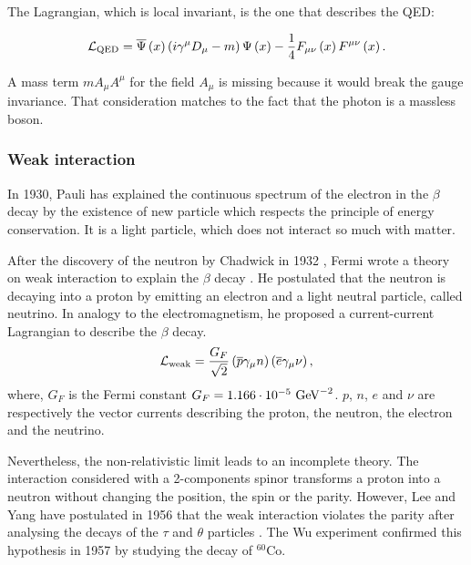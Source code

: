       The Lagrangian, which is local invariant, is the one that describes the \gls{QED}:

      \begin{equation}
          \mathcal{L}_{\rm{QED}} =  \overline{\Psi}\left(x\right)\left( i \gamma^\mu D_\mu - m \right) \Psi\left(x\right) - \frac{1}{4}F_{\mu \nu}\left(x\right) F^{\mu \nu}\left(x\right).
      \end{equation}

      A mass term $m A_{\mu} A^{\mu}$ for the field $A_{\mu}$ is missing because it would break the gauge invariance.
      That consideration matches to the fact that the photon is a massless boson.


    \subsubsection{Weak interaction}

    In 1930, Pauli has explained the continuous spectrum of the electron in the $\beta$ decay by the existence of new particle which respects the principle of energy conservation.
    It is a light particle, which does not interact so much with matter.

    After the discovery of the neutron by Chadwick in 1932 \cite{chadwick1932possible}, Fermi wrote a theory on weak interaction to explain the $\beta$ decay \cite{Fermi:1934hr}. 
    He postulated that the neutron is decaying into a proton by emitting an electron and a light neutral particle, called neutrino.
    In analogy to the electromagnetism, he proposed a current-current Lagrangian to describe the $\beta$ decay.
    \begin{equation}
      \mathcal{L}_{\rm{weak}} = \frac{G_F}{\sqrt{2}}\left(\overline{p} \gamma_{\mu} n \right) \left(\overline{e} \gamma_{\mu} \nu \right),
    \end{equation}
    where, $G_F$ is the Fermi constant $G_F = 1.166 \cdot 10^{-5}~\rm{GeV}^{-2}$. $p$, $n$, $e$ and $\nu$ are respectively the vector currents describing the proton, the neutron, the electron and the neutrino. 
    
    Nevertheless, the non-relativistic limit leads to an incomplete theory.
    The interaction considered with a 2-components spinor transforms a proton into a neutron without changing the position, the spin or the parity.
    However, Lee and Yang have postulated in 1956 that the weak interaction violates the parity after analysing the decays of the $\tau$ and $\theta$ particles \cite{1956PhRv..104..254L}.
    The Wu experiment \cite{1957PhRv..105.1413W} confirmed this hypothesis in 1957 by studying the decay of $^{60}$Co.

